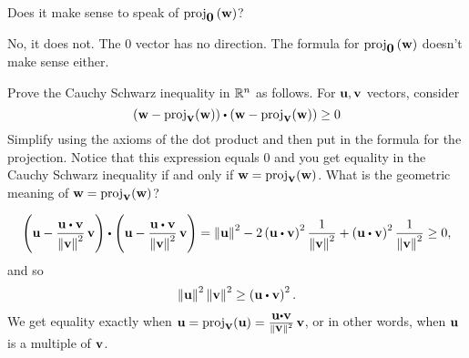 \begin{enumialphparenastyle}
\begin{ex}
  Does it make sense to speak of $\mbox{\rm proj}_{\mbox{\bf 0}}\left(\mbox{\bf w}\right)$?
  \begin{sol}
    No, it does not. The $0$ vector has no direction. The formula for
    $\mbox{\rm proj}_{\mbox{\bf 0}}\left(\mbox{\bf w}\right)$ doesn't make sense either.
  \end{sol}
\end{ex}

\begin{ex}
  Prove the Cauchy Schwarz inequality in $\mathbb{R}^{n}$ as follows.  For
  $\mbox{\bf u},\mbox{\bf v}$ vectors, consider
  \begin{equation*}
    \tup{\vect{w}-
      \func{proj}_{\vect{v}}(\vect{w})} \dotprod \tup{\vect{w}-
      \func{proj}_{\vect{v}}(\vect{w})} \geq 0
  \end{equation*}
  Simplify using the axioms of the dot product and then put in the
  formula for the projection. Notice that this expression equals $0$
  and you get equality in the Cauchy Schwarz inequality if and only if
  $\mbox{\bf w}=\mbox{\rm proj}_{\mbox{\bf v}}(\mbox{\bf w})$. What is the geometric
  meaning of $\mbox{\bf w}=\mbox{\rm proj}_{\mbox{\bf v}}(\mbox{\bf w})$?
  \begin{sol}
    \begin{equation*}
      \tup{\vect{u}-\frac{\vect{u}\dotprod \vect{v}}{\norm{\vect{v}}
          ^{2}}\,\vect{v}} \dotprod \tup{\vect{u}-\frac{\vect{u}\dotprod
          \vect{v}}{\norm{\vect{v}} ^{2}}\,\vect{v}} =\norm{\vect{u}}
      ^{2}-2\tup{\vect{u}\dotprod \vect{v}} ^{2}\frac{1}{\norm{
          \vect{v}} ^{2}}+\tup{\vect{u}\dotprod \vect{v}}
      ^{2}\frac{1}{ \norm{\vect{v}} ^{2}}\geq 0,
    \end{equation*}
    and so
    \begin{equation*}
      \norm{\vect{u}} ^{2}\norm{\vect{v}}
      ^{2}\geq \tup{\vect{u}\dotprod \vect{v}} ^{2}.
    \end{equation*}
    We get equality exactly when
    $\vect{u}=\func{proj}_{\vect{v}}(\vect{u}) =
    \frac{\vect{u}\dotprod \vect{v}}{\norm{\vect{v}} ^{2}}\,\vect{v}$,
    or in other words, when $\mbox{\bf u}$ is a multiple of $\mbox{\bf v}$.
  \end{sol}
\end{ex}



\end{enumialphparenastyle}
